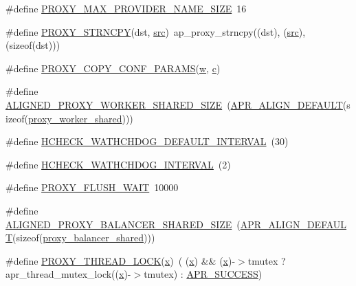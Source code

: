 \begin{DoxyCompactItemize}
\item 
\#define \hyperlink{group__MOD__PROXY_ga74aeb0c2a68e91a30850950b50baad4e}{P\+R\+O\+X\+Y\+\_\+\+M\+A\+X\+\_\+\+P\+R\+O\+V\+I\+D\+E\+R\+\_\+\+N\+A\+M\+E\+\_\+\+S\+I\+ZE}~16
\item 
\#define \hyperlink{group__MOD__PROXY_ga3054e793ece2f6c8e323f0a6076cd4ef}{P\+R\+O\+X\+Y\+\_\+\+S\+T\+R\+N\+C\+PY}(dst,  \hyperlink{apr__siphash_8h_ab3b4066b211a3d1de8f72e90b2bca8ab}{src})~ap\+\_\+proxy\+\_\+strncpy((dst), (\hyperlink{apr__siphash_8h_ab3b4066b211a3d1de8f72e90b2bca8ab}{src}), (sizeof(dst)))
\item 
\#define \hyperlink{group__MOD__PROXY_ga48766fb0774689616441f71cbd82503b}{P\+R\+O\+X\+Y\+\_\+\+C\+O\+P\+Y\+\_\+\+C\+O\+N\+F\+\_\+\+P\+A\+R\+A\+MS}(\hyperlink{pcregrep_8txt_ab9a0c51666082a4ca5dd995ee972f77e}{w},  \hyperlink{pcregrep_8txt_aef720ae5f62fa015619d00171d917416}{c})
\item 
\#define \hyperlink{group__MOD__PROXY_ga7f0794c1832593186fd875674ebb0d72}{A\+L\+I\+G\+N\+E\+D\+\_\+\+P\+R\+O\+X\+Y\+\_\+\+W\+O\+R\+K\+E\+R\+\_\+\+S\+H\+A\+R\+E\+D\+\_\+\+S\+I\+ZE}~(\hyperlink{group__apr__general_gab484e98426221f3212fcb67af0467381}{A\+P\+R\+\_\+\+A\+L\+I\+G\+N\+\_\+\+D\+E\+F\+A\+U\+LT}(sizeof(\hyperlink{structproxy__worker__shared}{proxy\+\_\+worker\+\_\+shared})))
\item 
\#define \hyperlink{group__MOD__PROXY_gab3c216cbcc944277faea49c1149a955c}{H\+C\+H\+E\+C\+K\+\_\+\+W\+A\+T\+H\+C\+H\+D\+O\+G\+\_\+\+D\+E\+F\+A\+U\+L\+T\+\_\+\+I\+N\+T\+E\+R\+V\+AL}~(30)
\item 
\#define \hyperlink{group__MOD__PROXY_ga39f9102bf1e77f61df9b9092b108a4c6}{H\+C\+H\+E\+C\+K\+\_\+\+W\+A\+T\+H\+C\+H\+D\+O\+G\+\_\+\+I\+N\+T\+E\+R\+V\+AL}~(2)
\item 
\#define \hyperlink{group__MOD__PROXY_gacca3ab0aa52920d4c5628e07ce84f82b}{P\+R\+O\+X\+Y\+\_\+\+F\+L\+U\+S\+H\+\_\+\+W\+A\+IT}~10000
\item 
\#define \hyperlink{group__MOD__PROXY_ga7270f4e9417e0e0ee4d51be39fc89fab}{A\+L\+I\+G\+N\+E\+D\+\_\+\+P\+R\+O\+X\+Y\+\_\+\+B\+A\+L\+A\+N\+C\+E\+R\+\_\+\+S\+H\+A\+R\+E\+D\+\_\+\+S\+I\+ZE}~(\hyperlink{group__apr__general_gab484e98426221f3212fcb67af0467381}{A\+P\+R\+\_\+\+A\+L\+I\+G\+N\+\_\+\+D\+E\+F\+A\+U\+LT}(sizeof(\hyperlink{structproxy__balancer__shared}{proxy\+\_\+balancer\+\_\+shared})))
\item 
\#define \hyperlink{group__MOD__PROXY_ga4fa0e4229760fdbc94c35580e2e466bb}{P\+R\+O\+X\+Y\+\_\+\+T\+H\+R\+E\+A\+D\+\_\+\+L\+O\+CK}(\hyperlink{pcregrep_8txt_a4242e9148f20c002763bf4ba53b26ad6}{x})~( (\hyperlink{pcregrep_8txt_a4242e9148f20c002763bf4ba53b26ad6}{x}) \&\& (\hyperlink{pcregrep_8txt_a4242e9148f20c002763bf4ba53b26ad6}{x})-\/$>$tmutex ? apr\+\_\+thread\+\_\+mutex\+\_\+lock((\hyperlink{pcregrep_8txt_a4242e9148f20c002763bf4ba53b26ad6}{x})-\/$>$tmutex) \+: \hyperlink{group__apr__errno_ga9ee311b7bf1c691dc521d721339ee2a6}{A\+P\+R\+\_\+\+S\+U\+C\+C\+E\+SS})

\end{DoxyCompactItemize}
